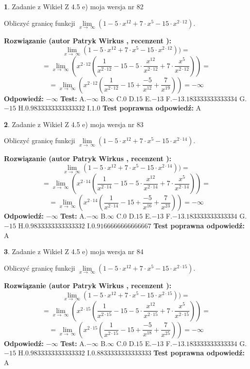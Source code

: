 \documentclass[12pt, a4paper]{article}
\theoremstyle{definition} %
\newtheorem{zad}{}
\newcommand{\zadStart}[1]{\begin{zad}#1\newline}
\newcommand{\zadStop}{\end{zad}}
\newcommand{\rozwStart}[2]{\noindent \textbf{Rozwiązanie (autor #1 , recenzent #2): }\newline}
\newcommand{\rozwStop}{\newline}
\newcommand{\odpStart}{\noindent \textbf{Odpowiedź:}\newline}
\newcommand{\odpStop}{\newline}
\newcommand{\testStart}{\noindent \textbf{Test:}\newline}
\newcommand{\testStop}{\newline}
\newcommand{\kluczStart}{\noindent \textbf{Test poprawna odpowiedź:}\newline}
\newcommand{\kluczStop}{\newline}
\begin{document}
\zadStart{Zadanie z Wikieł Z 4.5 e) moja wersja nr 82}


Obliczyć granicę funkcji  $\lim\limits_{x\to\ \infty}(1 - 5 \cdot x^{12}+7 \cdot x^{5}- 15 \cdot x^{2\cdot12})$.
\zadStop
\rozwStart{Patryk Wirkus}{}
$$\lim\limits_{x\to\ \infty}(1 - 5 \cdot x^{12}+7 \cdot x^{5}- 15 \cdot x^{2\cdot12}))=$$
$$=\lim\limits_{x\to\ \infty}(x^{2\cdot12}(\frac{1}{x^{2\cdot12}}-15 -5 \cdot \frac{x^{12}}{x^{2\cdot12}}+7 \cdot \frac{x^{5}}{x^{2\cdot12}}))=$$
$$=\lim\limits_{x\to\ \infty}(x^{2\cdot12}(\frac{1}{x^{2\cdot12}}-15 + \frac{-5}{x^{12}}+ \frac{7}{x^{19}}))=-\infty$$
\rozwStop
\odpStart
$-\infty$
\odpStop
\testStart
A.$-\infty$ B.$\infty$ C.$0$ D.$15$ E.$-13$
F.$-13.183333333333334$ G.$-15$
H.$0.9833333333333332$
I.$1.0$
\testStop
\kluczStart
A
\kluczStop



\zadStart{Zadanie z Wikieł Z 4.5 e) moja wersja nr 83}


Obliczyć granicę funkcji  $\lim\limits_{x\to\ \infty}(1 - 5 \cdot x^{12}+7 \cdot x^{5}- 15 \cdot x^{2\cdot14})$.
\zadStop
\rozwStart{Patryk Wirkus}{}
$$\lim\limits_{x\to\ \infty}(1 - 5 \cdot x^{12}+7 \cdot x^{5}- 15 \cdot x^{2\cdot14}))=$$
$$=\lim\limits_{x\to\ \infty}(x^{2\cdot14}(\frac{1}{x^{2\cdot14}}-15 -5 \cdot \frac{x^{12}}{x^{2\cdot14}}+7 \cdot \frac{x^{5}}{x^{2\cdot14}}))=$$
$$=\lim\limits_{x\to\ \infty}(x^{2\cdot14}(\frac{1}{x^{2\cdot14}}-15 + \frac{-5}{x^{16}}+ \frac{7}{x^{23}}))=-\infty$$
\rozwStop
\odpStart
$-\infty$
\odpStop
\testStart
A.$-\infty$ B.$\infty$ C.$0$ D.$15$ E.$-13$
F.$-13.183333333333334$ G.$-15$
H.$0.9833333333333332$
I.$0.9166666666666667$
\testStop
\kluczStart
A
\kluczStop



\zadStart{Zadanie z Wikieł Z 4.5 e) moja wersja nr 84}


Obliczyć granicę funkcji  $\lim\limits_{x\to\ \infty}(1 - 5 \cdot x^{12}+7 \cdot x^{5}- 15 \cdot x^{2\cdot15})$.
\zadStop
\rozwStart{Patryk Wirkus}{}
$$\lim\limits_{x\to\ \infty}(1 - 5 \cdot x^{12}+7 \cdot x^{5}- 15 \cdot x^{2\cdot15}))=$$
$$=\lim\limits_{x\to\ \infty}(x^{2\cdot15}(\frac{1}{x^{2\cdot15}}-15 -5 \cdot \frac{x^{12}}{x^{2\cdot15}}+7 \cdot \frac{x^{5}}{x^{2\cdot15}}))=$$
$$=\lim\limits_{x\to\ \infty}(x^{2\cdot15}(\frac{1}{x^{2\cdot15}}-15 + \frac{-5}{x^{18}}+ \frac{7}{x^{25}}))=-\infty$$
\rozwStop
\odpStart
$-\infty$
\odpStop
\testStart
A.$-\infty$ B.$\infty$ C.$0$ D.$15$ E.$-13$
F.$-13.183333333333334$ G.$-15$
H.$0.9833333333333332$
I.$0.8833333333333333$
\testStop
\kluczStart
A
\kluczStop
\end{document}
